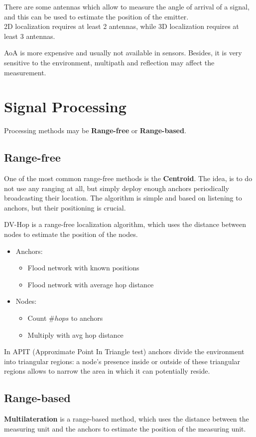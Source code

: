 There are some antennas which allow to measure the angle of arrival of a signal, and this can be used to estimate the position of the emitter.\\
2D localization requires at least 2 antennas, while 3D localization requires at least 3 antennas.

AoA is more expensive and usually not available in sensors. Besides, it is very sensitive to the environment, multipath and reflection may affect the measurement.

\section{Signal Processing}
Processing methods may be \textbf{Range-free} or \textbf{Range-based}.

\subsection{Range-free}
One of the most common range-free methods is the \textbf{Centroid}. 
The idea, is to do not use any ranging at all, but simply
deploy enough anchors periodically broadcasting their
location.
The algorithm is simple and based on listening to anchors, but their positioning is crucial.
\nl

DV-Hop is a range-free localization algorithm, which uses the distance between nodes to estimate the position of the nodes.
\begin{itemize}
   \item Anchors:
   \begin{itemize}
      \item Flood network with known positions
      \item Flood network with average hop distance
   \end{itemize}
   \item Nodes:
   \begin{itemize}
      \item Count $\#hops$ to anchors
      \item Multiply with avg hop distance
   \end{itemize}
\end{itemize}
\nl

In APIT (Approximate Point In Triangle test) anchors divide the environment into triangular regions:
a node's presence inside or outside of these triangular regions allows to narrow the area in which it can potentially reside.

\subsection{Range-based}
\textbf{Multilateration} is a range-based method, which uses the distance between the measuring unit and the anchors to estimate the position of the measuring unit.


